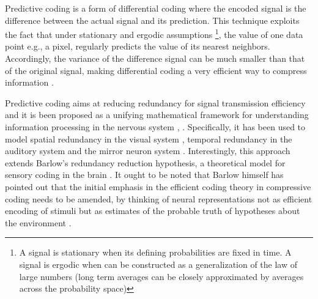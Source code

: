 \documentclass[11pt, onecolumn]{article}
\begin{document}
Predictive coding is a form of differential coding where the encoded signal is the difference between the actual signal and its prediction. This technique exploits the fact that under stationary and ergodic assumptions \footnote{A signal is stationary when its defining probabilities are fixed in time. A signal is ergodic when can be constructed as a generalization of the law of large numbers (long term averages can be closely approximated by averages across the probability space)}, the value of one data point e.g., a pixel, regularly predicts the value of its nearest neighbors. Accordingly, the variance of the difference signal can be much smaller than that of the original signal, making differential coding a very efficient way to compress information \citep{shi_image_1999}.

Predictive coding aims at reducing redundancy for signal transmission efficiency and it is been proposed as a unifying mathematical framework for understanding information processing in the nervous system \citep{Friston:2010}, \citep{huang_predictive_2011}. Specifically, it has been used to model spatial redundancy in the visual system \citep{srinivasan_predictive_1982}, temporal redundancy in the auditory system \citep{baldeweg_repetition_2006} and the mirror neuron system \citep{kilner_predictive_2007}. Interestingly, this approach extends Barlow's redundancy reduction hypothesis, a theoretical model for sensory coding in the brain \citep{Barlow:1972}. It ought to be noted that Barlow himself has pointed out that the initial emphasis in the efficient coding theory in compressive coding %
needs to be amended, by thinking of neural representations not as efficient encoding of stimuli but as estimates of the probable truth of hypotheses about the environment \citep{barlow_redundancy_2001}. 
\end{document}
